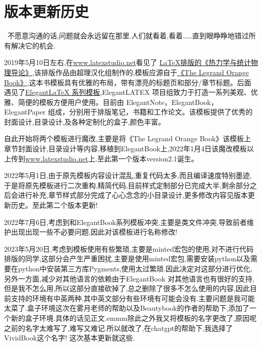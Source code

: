 \chapter{版本更新历史}
\begin{center}
\textcolor[RGB]{255, 0, 0}{\faHeart}~不愿意沟通的话,问题就会永远留在那里.人们就看着,看着……直到眼睁睁地错过所有解决它的机会.~\textcolor[RGB]{255, 0, 0}{\faHeart}
\end{center}
\begin{center}
\end{center}

2019年5月10日左右,在\href{latexstudio论坛}{www.latexstudio.net}看见了
\href{https://www.latexstudio.net/archives/10715.html}{LaTeX排版的《热力学与统计物理导论》},该排版作品由超理汉化组制作的,模板应源自于\href{http://www.latextemplates.com/template/the-legrand-orange-book}{《The Legrand Orange Book》},这本书模板具有优雅的布局，带有漂亮的标题页和部分/章节标题。后面遇见了\href{https://elegantlatex.org/}{Elegant\LaTeX{} 系列模板},ElegantLATEX 项目组致力于打造一系列美观、优雅、简便的模板方便用户使用。目前由
ElegantNote，ElegantBook，ElegantPaper 组成，分别用于排版笔记，书籍和工作论文。该模板提供了优秀的封面设计,目录设计,及各种定制化的盒子,颜色丰富。

自此开始将两个模板进行魔改,主要是将《The Legrand Orange Book》该模板上章节封面设计,目录设计等内容,移植到ElegantBook上,2022年1月4日该魔改模板以上传到\href{latexstudio论坛}{www.latexstudio.net}上.至此第一个版本version2.1诞生。

2022年5月1日,由于原先模板内容设计混乱,重复代码太多,而且编译速度特别墨迹,于是将原先模板进行二次重构,精简代码,目前样式定制部分已完成大半,剩余部分之后会进行补充,章节样式部分完成了心心念念的小目录设计,更多修改内容见版本更新历史。至此第二个版本更新!

2022年7月6日,考虑到和ElegantBook系列模板冲突,主要是类文件冲突,导致前者维护出现出现一些不必要问题,因此对该模板进行名称修改!

2023年5月20日,考虑到模板使用有些繁琐,主要是minted宏包的使用,对不进行代码排版的同学,这部分会产生严重困扰,主要是使用minted宏包,需要安装python以及需要在python中安装第三方库Pygments,使用太过繁琐.因此决定对这部分进行优化,另外一方面,减少对其他语言的依赖由于ElegantBook
对其他语言也有很好的支持,但是我不怎么用,所以这部分直接砍掉了,总之删除了很多不怎么使用的内容,因此目前支持的环境有中英两种.其中英文部分有些环境有可能会没有.主要问题是我可能太菜了.盒子环境这次在雾月老师的帮助以及Beautybook的作者的帮助下,添加了一个新的盒子环境.具体的话见正文.emmm除此之外我又将模板的名字更改了,原因呢之前的名字太难写了,难写又难记.所以就改了,在chatgpt的帮助下,我选择了VividBook这个名字!
这次基本更新就这些.

